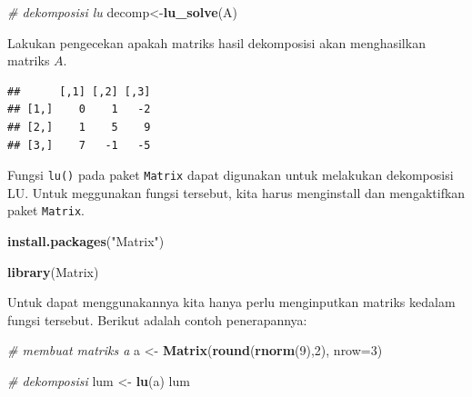 \documentclass[]{book}
\newenvironment{Shaded}{\begin{snugshade}}{\end{snugshade}}
\newcommand{\CommentTok}[1]{\textcolor[rgb]{0.56,0.35,0.01}{\textit{#1}}}
\newcommand{\DataTypeTok}[1]{\textcolor[rgb]{0.13,0.29,0.53}{#1}}
\newcommand{\DecValTok}[1]{\textcolor[rgb]{0.00,0.00,0.81}{#1}}
\newcommand{\KeywordTok}[1]{\textcolor[rgb]{0.13,0.29,0.53}{\textbf{#1}}}
\newcommand{\NormalTok}[1]{#1}
\newcommand{\OperatorTok}[1]{\textcolor[rgb]{0.81,0.36,0.00}{\textbf{#1}}}
\newcommand{\StringTok}[1]{\textcolor[rgb]{0.31,0.60,0.02}{#1}}
\theoremstyle{definition}
\theoremstyle{definition}
\theoremstyle{definition}
\theoremstyle{remark}
\begin{document}
\begin{Shaded}
\begin{Highlighting}[]
\CommentTok{# dekomposisi lu}
\NormalTok{decomp<-}\KeywordTok{lu_solve}\NormalTok{(A)}
\end{Highlighting}
\end{Shaded}

Lakukan pengecekan apakah matriks hasil dekomposisi akan menghasilkan matriks \(A\).

\begin{Shaded}
\end{Shaded}

\begin{verbatim}
##      [,1] [,2] [,3]
## [1,]    0    1   -2
## [2,]    1    5    9
## [3,]    7   -1   -5
\end{verbatim}

Fungsi \texttt{lu()} pada paket \texttt{Matrix} dapat digunakan untuk melakukan dekomposisi LU. Untuk meggunakan fungsi tersebut, kita harus menginstall dan mengaktifkan paket \texttt{Matrix}.

\begin{Shaded}
\begin{Highlighting}[]
\KeywordTok{install.packages}\NormalTok{(}\StringTok{"Matrix"}\NormalTok{)}
\end{Highlighting}
\end{Shaded}

\begin{Shaded}
\begin{Highlighting}[]
\KeywordTok{library}\NormalTok{(Matrix)}
\end{Highlighting}
\end{Shaded}

Untuk dapat menggunakannya kita hanya perlu menginputkan matriks kedalam fungsi tersebut. Berikut adalah contoh penerapannya:

\begin{Shaded}
\begin{Highlighting}[]
\CommentTok{# membuat matriks a }
\NormalTok{a <-}\StringTok{ }\KeywordTok{Matrix}\NormalTok{(}\KeywordTok{round}\NormalTok{(}\KeywordTok{rnorm}\NormalTok{(}\DecValTok{9}\NormalTok{),}\DecValTok{2}\NormalTok{), }\DataTypeTok{nrow=}\DecValTok{3}\NormalTok{)}

\CommentTok{# dekomposisi}
\NormalTok{lum <-}\StringTok{ }\KeywordTok{lu}\NormalTok{(a)}
\NormalTok{lum}
\end{Highlighting}
\end{Shaded}
\end{document}
